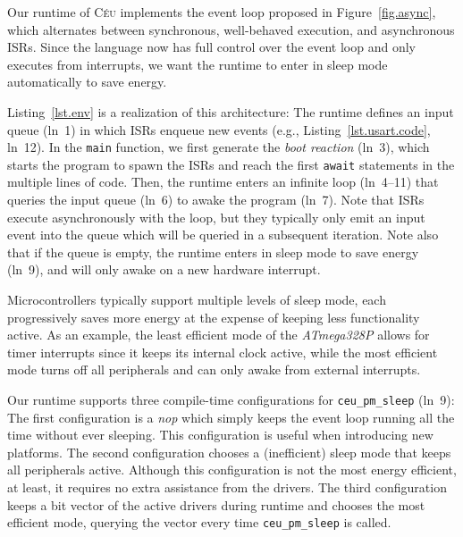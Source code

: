 \documentclass[sigplan,10pt,review,anonymous]{acmart}\settopmatter{printfolios=true,printccs=false,printacmref=false}
\newcommand{\CEU}{\textsc{C\'{e}u}\xspace}
\newcommand{\code}[1] {{\small{\texttt{#1}}}}
\begin{document}
Our runtime of \CEU implements the event loop proposed in
Figure~\ref{fig.async}, which alternates between synchronous, well-behaved
execution, and asynchronous ISRs.
%
Since the language now has full control over the event loop and only executes
from interrupts, we want the runtime to enter in sleep mode automatically to
save energy.

Listing~\ref{lst.env} is a realization of this architecture:
%
The runtime defines an input queue (ln~1) in which ISRs enqueue new events
(e.g., Listing~\ref{lst.usart.code}, ln~12).
%
In the \code{main} function, we first generate the \emph{boot reaction} (ln~3),
which starts the program to spawn the ISRs and reach the first \code{await}
statements in the multiple lines of code.
%
Then, the runtime enters an infinite loop (ln~4--11) that queries the input
queue (ln~6) to awake the program (ln~7).
%
Note that ISRs execute asynchronously with the loop, but they typically only
emit an input event into the queue which will be queried in a subsequent
iteration.
%
Note also that if the queue is empty, the runtime enters in sleep mode to save
energy (ln~9), and will only awake on a new hardware interrupt.

Microcontrollers typically support multiple levels of sleep mode, each
progressively saves more energy at the expense of keeping less functionality
active.
%
As an example, the least efficient mode of the \emph{ATmega328P} allows for
timer interrupts since it keeps its internal clock active, while the most
efficient mode turns off all peripherals and can only awake from external
interrupts.

Our runtime supports three compile-time configurations for \code{ceu\_pm\_sleep}
(ln~9):
%
The first configuration is a \emph{nop} which simply keeps the event loop
running all the time without ever sleeping.
This configuration is useful when introducing new platforms.
%
The second configuration chooses a (inefficient) sleep mode that keeps all
peripherals active.
Although this configuration is not the most energy efficient, at least, it
requires no extra assistance from the drivers.
%
The third configuration keeps a bit vector of the active drivers during runtime
and chooses the most efficient mode, querying the vector every time
\code{ceu\_pm\_sleep} is called.
\end{document}
